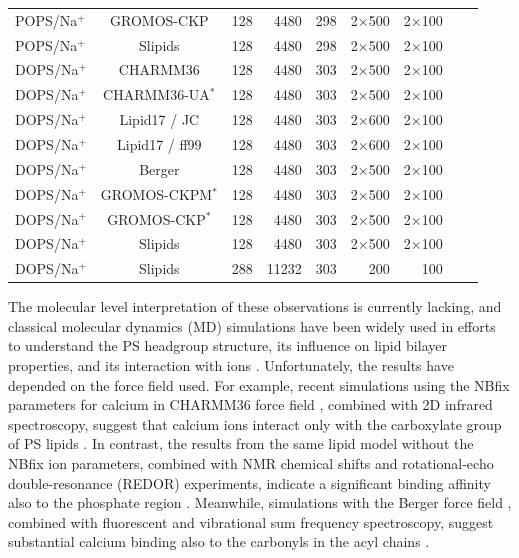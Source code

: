 \documentclass[aps,prl,superscriptaddress,twocolumn]{revtex4}
\begin{document}
\begin{table}[htb]
\begin{tabular}{lcrrrrrcc}
POPS/Na$^{+}$  & GROMOS-CKP \cite{Chandrasekhar03,kukol09,piggot12} & 128  & 4480  & 298  & 2$\times$500  & 2$\times$100  & \cite{ckp2POPS303K}  & \tabularnewline
POPS/Na$^{+}$  & Slipids \cite{jambeck13}  & 128  & 4480  & 298  & 2$\times$500  & 2$\times$100  & \cite{slipidsPOPS298K}  & \tabularnewline
\hline 
DOPS/Na$^{+}$  & CHARMM36 \cite{venable13}  & 128  & 4480  & 303  & 2$\times$500  & 2$\times$100  & \cite{charmm36DOPS303K}  & \tabularnewline
DOPS/Na$^{+}$  & CHARMM36-UA$^*$ \cite{venable13,lee14} & 128  & 4480  & 303  & 2$\times$500  & 2$\times$100  & \cite{charmm36uaDOPS303K}  & \tabularnewline
DOPS/Na$^{+}$  & Lipid17 \cite{gould18} / JC \cite{joung08}  & 128  & 4480  & 303  & 2$\times$600  & 2$\times$100  & \cite{lipid17DOPSjcions}  & \tabularnewline
DOPS/Na$^{+}$  & Lipid17 \cite{gould18} / ff99 \cite{aqvist90}  & 128  & 4480  & 303  & 2$\times$600  & 2$\times$100  & \cite{lipid17DOPSff99ions}  & \tabularnewline
DOPS/Na$^{+}$  & Berger \cite{mukhopadhyay04}  & 128  & 4480  & 303  & 2$\times$500  & 2$\times$100  & \cite{bergerDOPS303K}  & \tabularnewline
DOPS/Na$^{+}$  & GROMOS-CKPM$^*$ \cite{piggot12} & 128  & 4480  & 303  & 2$\times$500  & 2$\times$100  & \cite{ckp1DOPS303K}  & \tabularnewline
DOPS/Na$^{+}$  & GROMOS-CKP$^*$ \cite{piggot12}  & 128  & 4480  & 303  & 2$\times$500  & 2$\times$100  & \cite{ckp2DOPS303K}  & \tabularnewline
DOPS/Na$^{+}$  & Slipids \cite{jambeck13}  & 128  & 4480  & 303  & 2$\times$500  & 2$\times$100  & \cite{slipidsDOPS303K}  & \tabularnewline
DOPS/Na$^{+}$  & Slipids \cite{jambeck13}  & 288  & 11232  & 303  & 200  & 100  & \cite{slipidsDOPSfiles}  & \tabularnewline
\end{tabular}
\end{table}


The molecular level interpretation of these observations is currently lacking, and classical molecular dynamics (MD) simulations have been widely used in efforts 
to understand the PS headgroup structure, its influence on lipid bilayer properties, and its
interaction with
ions \cite{cascales96,pandit02,mukhopadhyay04,pedersen06,vernier09,boettcher11,molina12,jurkiewicz12,venable13,pan14,vangaveti14,melcrova16,valentine18,hallock18}.
Unfortunately, the results have depended on the force field used.
For example, recent simulations using the NBfix parameters for calcium \cite{kim16} in
CHARMM36 force field \cite{klauda10,venable13}, combined with 2D infrared spectroscopy,
suggest that calcium ions interact only with the carboxylate group of PS lipids \cite{valentine18}. In contrast,
the results from the same lipid model without the NBfix ion parameters, combined with NMR chemical shifts and
rotational-echo double-resonance (REDOR) experiments, indicate a significant binding affinity also to the phosphate region \cite{hallock18}.
Meanwhile, simulations with the Berger force field \cite{berger97,mukhopadhyay04},
combined with fluorescent and vibrational sum frequency spectroscopy, suggest substantial
calcium binding also to the carbonyls in the acyl chains \cite{melcrova16}.
\end{document}
